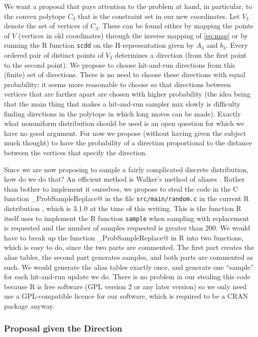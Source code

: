 \documentclass[11pt]{article}
\begin{document}
We want a proposal that pays attention to the problem at hand, in particular,
to the convex polytope $C_3$ that is the constraint set in our new coordinates.
Let $V_3$ denote the set of vertices of $C_3$.  These can be found either
by mapping the points of $V$ (vertices in old coordinates) through the
inverse mapping of \eqref{eq:map} or by running the R function \texttt{scdd}
on the H-representation given by $A_3$ and $b_3$.  Every ordered pair of
distinct points of $V_3$ determines a direction (from the first point to the
second point).  We propose to choose hit-and-run directions from this
(finite) set of directions.  There is no need to choose these directions
with equal probability; it seems more reasonable to choose so that directions
between vertices that are farther apart are chosen with higher probability
(the idea being that the main thing that makes a hit-and-run sampler mix
slowly is difficulty finding directions in the polytope in which long moves
can be made).  Exactly what nonuniform distribution should be used is an
open question for which we have no good argument.  For now we propose
(without having given the subject much thought) to have the probability
of a direction proportional to the distance between the vertices that
specify the direction.

Since we are now proposing to sample a fairly complicated discrete
distribution, how do we do that?  An efficient method is Walker's method
of aliases \citep{walker}.  Rather than bother to implement it ourselves,
we propose to steal the code
in the C function \verb@walker_ProbSampleReplace@ in the file
\texttt{src/main/random.c} in the current R distribution \citep{r},
which is 3.1.0 at the time of this writing.  This is the function R
itself uses to implement the R function \texttt{sample} when sampling
with replacement is requested and the number of samples requested
is greater than 200.  We would have to break up the function
\verb@walker_ProbSampleReplace@ in R into two functions, which is
easy to do, since the two parts are commented.  The first part creates
the alias tables, the second part generates samples, and both parts
are commented as such.  We would generate the alias tables exactly once,
and generate one ``sample'' for each hit-and-run update we do.
There is no problem in our stealing this code because R is free software
(GPL version 2 or any later version) so we only need use a GPL-compatible
licence for our software, which is required to be a CRAN package anyway.

\subsubsection{Proposal given the Direction}
\end{document}
